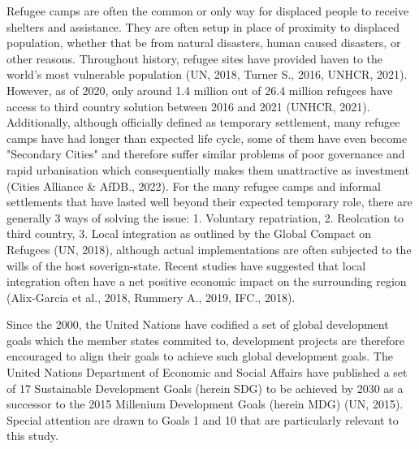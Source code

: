 \documentclass[11pt, a4paper, twoside]{report}
\begin{document}
Refugee camps are often the common or only way for displaced people to receive shelters and assistance. They are often setup in place of proximity to displaced population, whether that be from natural disasters, human caused disasters, or other reasons. Throughout history, refugee sites have provided haven to the world's most vulnerable population (UN, 2018, Turner S., 2016, UNHCR, 2021). However, as of 2020, only around 1.4 million out of 26.4 million refugees have access to third country solution between 2016 and 2021 (UNHCR, 2021). Additionally, although officially defined as temporary settlement, many refugee camps have had longer than expected life cycle, some of them have even become "Secondary Cities" and therefore suffer similar problems of poor governance and rapid urbanisation which consequentially makes them unattractive as investment (Cities Alliance \& AfDB., 2022). For the many refugee camps and informal settlements that have lasted well beyond their expected temporary role, there are  generally 3 ways of solving the issue: 1. Voluntary repatriation, 2. Reolcation to third country, 3. Local integration as outlined by the Global Compact on Refugees (UN, 2018), although actual implementations are often subjected to the wills of the host soverign-state. Recent studies have suggested that local integration often have a net positive economic impact on the surrounding region (Alix-Garcia et al., 2018, Rummery A., 2019, IFC., 2018). \\\par

Since the 2000, the United Nations have codified a set of global development goals which the member states commited to, development projects are therefore encouraged to align their goals to achieve such global development goals. The United Nations Department of Economic and Social Affairs have published a set of 17 Sustainable Development Goals (herein SDG) to be achieved by 2030 as a successor to the 2015 Millenium Development Goals (herein MDG) (UN, 2015). Special attention are drawn to Goals 1 and 10 that are particularly relevant to this study.\\\par
\end{document}
